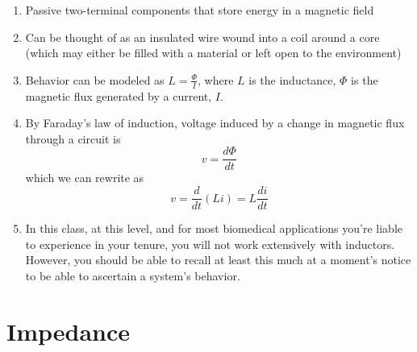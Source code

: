 \documentclass[11pt]{book}
\begin{document}
\begin{enumerate}
	\item Passive two-terminal components that store energy in a magnetic field
	\item Can be thought of as an insulated wire wound into a coil around a core (which may either be filled with a material or left open to the environment)
	\item Behavior can be modeled as $L = \frac{\Phi}{I}$, where $L$ is the inductance, $\Phi$ is the magnetic flux generated by a current, $I$.
	\item By Faraday's law of induction, voltage induced by a change in magnetic flux through a circuit is
	\begin{equation}
		v = \frac{d\Phi}{dt}
	\end{equation}
	which we can rewrite as
	\begin{equation}
		v = \frac{d}{dt}(Li) = L\frac{di}{dt}
	\end{equation}
	\item In this class, at this level, and for most biomedical applications you're liable to experience in your tenure, you will not work extensively with inductors. However, you should be able to recall at least this much at a moment's notice to be able to ascertain a system's behavior.
\end{enumerate}




\section{Impedance}
\end{document}
